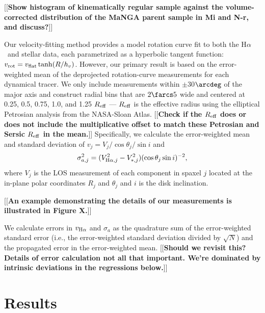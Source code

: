 \documentclass[apj,iop,revtex4,numberedappendix]{emulateapj}
\newcommand{\comment}[2][todo]{{\color{#1}[[{\bf #2}]]}}
\newcommand{\halpha}{H$\alpha$}
\begin{document}
\comment{Show histogram of kinematically regular sample against the
volume-corrected distribution of the MaNGA parent sample in Mi and N-r,
and discuss?}

Our velocity-fitting method provides a model rotation curve fit to both
the \halpha\ and stellar data, each parametrized as a hyperbolic tangent
function: $v_{\rm rot} = v_{\rm flat} \tanh(R/h_v)$.  However, our
primary result is based on the error-weighted mean of the deprojected
rotation-curve measurements for each dynamical tracer.  We only include
measurements within $\pm$30$\arcdeg$ of the major axis and construct
radial bins that are $2\farcs5$ wide and centered at 0.25, 0.5, 0.75,
1.0, and 1.25 $R_{\rm eff}$ --- $R_{\rm eff}$ is the effective radius
using the elliptical Petrosian analysis from the NASA-Sloan Atlas.
\comment{Check if the $R_{\rm eff}$ does or does not include the
multiplicative offset to match these Petrosian and Sersic $R_{\rm eff}$
in the mean.}  Specifically, we calculate the error-weighted mean and
standard deviation of $v_j = V_j/\cos\theta_j/\sin i$ and
%
\begin{equation}
%
\sigma_{a,j}^2 = (V_{{\rm H}\alpha,j}^2 - V_{\ast,j}^2) (\cos\theta_j
\sin i)^{-2},
%
\label{eq:dproj}
%
\end{equation}
%
where $V_j$ is the LOS measurement of each component in spaxel $j$
located at the in-plane polar coordinates $R_j$ and $\theta_j$ and $i$
is the disk inclination.

\comment{An example demonstrating the details of our measurements is
illustrated in Figure X.}

We calculate errors in $v_{{\rm H}\alpha}$ and $\sigma_a$ as the
quadrature sum of the error-weighted standard error (i.e., the
error-weighted standard deviation divided by $\sqrt{N}$) and the
propagated error in the error-weighted mean. \comment{Should we revisit
this?  Details of error calculation not all that important.  We're
dominated by intrinsic deviations in the regressions below.}

\section{Results}
\label{sec:results}
\end{document}
